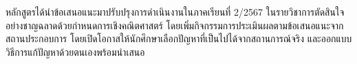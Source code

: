 หลักสูตรได้นำข้อเสนอแนะมาปรับปรุงการดำเนินงานในภาคเรียนที่ 2/2567 ในรายวิชาการตัดสินใจอย่างชาญฉลาดด้วยกำหนดการเชิงคณิตศาสตร์ โดยเพิ่มกิจกรรมการประเมินผลตามข้อเสนอแนะจากสถานประกอบการ โดยเปิดโอกาสให้นักศึกษาเลือกปัญหาที่เป็นไปได้จากสถานการณ์จริง และออกแบบวิธีการแก้ปัญหาด้วยตนเองพร้อมนำเสนอ




\begin{doclist}
\end{doclist}


